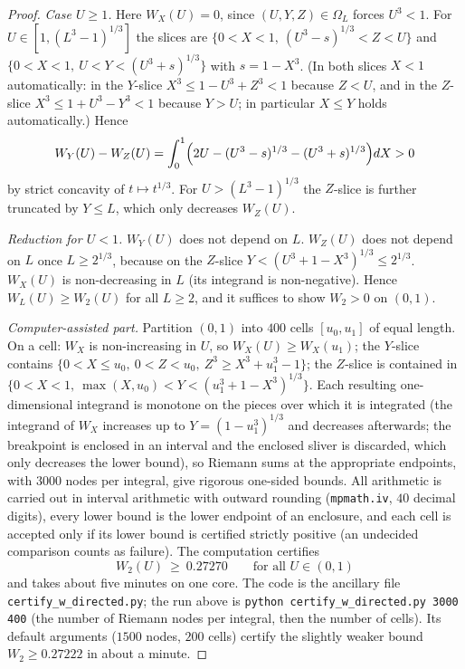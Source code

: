 \documentclass[11pt]{amsart}
\theoremstyle{remark}
\begin{document}
\begin{proof}
\emph{Case $U\ge1$.} Here $W_X(U)=0$, since $(U,Y,Z)\in\Omega_L$ forces $U^3<1$. For $U\in[1,(L^3-1)^{1/3}]$ the slices are $\{0<X<1,\ (U^3-s)^{1/3}<Z<U\}$ and $\{0<X<1,\ U<Y<(U^3+s)^{1/3}\}$ with $s=1-X^3$. (In both slices $X<1$ automatically: in the $Y$-slice $X^3\le1-U^3+Z^3<1$ because $Z<U$, and in the $Z$-slice $X^3\le1+U^3-Y^3<1$ because $Y>U$; in particular $X\le Y$ holds automatically.) Hence
\[
W_Y(U)-W_Z(U)=\int_0^1\Bigl(2U-(U^3-s)^{1/3}-(U^3+s)^{1/3}\Bigr)dX>0
\]
by strict concavity of $t\mapsto t^{1/3}$. For $U>(L^3-1)^{1/3}$ the $Z$-slice is further truncated by $Y\le L$, which only decreases $W_Z(U)$.

\emph{Reduction for $U<1$.} $W_Y(U)$ does not depend on $L$. $W_Z(U)$ does not depend on $L$ once $L\ge2^{1/3}$, because on the $Z$-slice $Y<(U^3+1-X^3)^{1/3}\le2^{1/3}$. $W_X(U)$ is non-decreasing in $L$ (its integrand is non-negative). Hence $W_L(U)\ge W_2(U)$ for all $L\ge2$, and it suffices to show $W_2>0$ on $(0,1)$.

\emph{Computer-assisted part.} Partition $(0,1)$ into $400$ cells $[u_0,u_1]$ of equal length. On a cell:
$W_X$ is non-increasing in $U$, so $W_X(U)\ge W_X(u_1)$;
the $Y$-slice contains $\{0<X\le u_0,\ 0<Z<u_0,\ Z^3\ge X^3+u_1^3-1\}$;
the $Z$-slice is contained in $\{0<X<1,\ \max(X,u_0)<Y<(u_1^3+1-X^3)^{1/3}\}$.
Each resulting one-dimensional integrand is monotone on the pieces over which it is integrated (the integrand of $W_X$ increases up to $Y=(1-u_1^3)^{1/3}$ and decreases afterwards; the breakpoint is enclosed in an interval and the enclosed sliver is discarded, which only decreases the lower bound), so Riemann sums at the appropriate endpoints, with $3000$ nodes per integral, give rigorous one-sided bounds. All arithmetic is carried out in interval arithmetic with outward rounding (\texttt{mpmath.iv}, $40$ decimal digits), every lower bound is the lower endpoint of an enclosure, and each cell is accepted only if its lower bound is certified strictly positive (an undecided comparison counts as failure). The computation certifies
\[
W_2(U)\ \ge\ 0.27270\qquad\text{for all }U\in(0,1)
\]
and takes about five minutes on one core. The code is the ancillary file \texttt{certify\_w\_directed.py}; the run above is \texttt{python certify\_w\_directed.py 3000 400} (the number of Riemann nodes per integral, then the number of cells). Its default arguments ($1500$ nodes, $200$ cells) certify the slightly weaker bound $W_2\ge0.27222$ in about a minute.
\end{proof}
\end{document}
